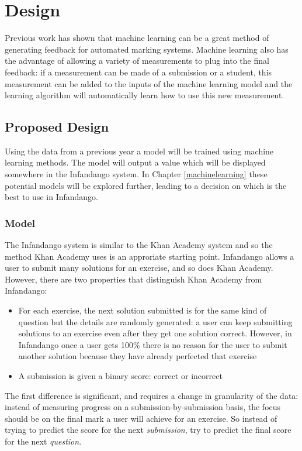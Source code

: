 \chapter{Design}
\label{design}
Previous work has shown that machine learning can be a great method of generating feedback for automated marking systems. Machine learning also has the advantage of allowing a variety of measurements to plug into the final feedback: if a measurement can be made of a submission or a student, this measurement can be added to the inputs of the machine learning model and the learning algorithm will automatically learn how to use this new measurement.

\section{Proposed Design}
Using the data from a previous year a model will be trained using machine learning methods. The model will output a value which will be displayed somewhere in the Infandango system. In Chapter \ref{machinelearning} these potential models will be explored further, leading to a decision on which is the best to use in Infandango.
\subsection{Model}
The Infandango system is similar to the Khan Academy system and so the method Khan Academy uses is an approriate starting point. Infandango allows a user to submit many solutions for an exercise, and so does Khan Academy. However, there are two properties that distinguish Khan Academy from Infandango:

\begin{itemize}
\item For each exercise, the next solution submitted is for the same kind of question but the details are randomly generated: a user can keep submitting solutions to an exercise even after they get one solution correct. However, in Infandango once a user gets 100\% there is no reason for the user to submit another solution because they have already perfected that exercise
\item A submission is given a binary score: correct or incorrect
\end{itemize}

The first difference is significant, and requires a change in granularity of the data: instead of measuring progress on a submission-by-submission basis, the focus should be on the final mark a user will achieve for an exercise. So instead of trying to predict the score for the next {\it submission}, try to predict the final score for the next {\it question}.

